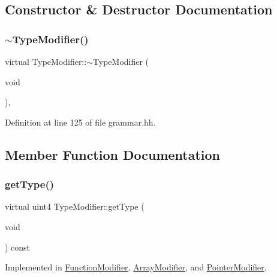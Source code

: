 \subsection{Constructor \& Destructor Documentation}
\mbox{\label{class_type_modifier_abf04bdcbbffd7d344fcd2ea3fb2e43a0}} 
\subsubsection{\texorpdfstring{$\sim$TypeModifier()}{~TypeModifier()}}
{\footnotesize\ttfamily virtual Type\+Modifier\+::$\sim$\+Type\+Modifier (\begin{DoxyParamCaption}\item[{void}]{ }\end{DoxyParamCaption})\hspace{0.3cm}{\ttfamily [inline]}, {\ttfamily [virtual]}}



Definition at line 125 of file grammar.\+hh.



\subsection{Member Function Documentation}
\mbox{\label{class_type_modifier_aac3cedefacdceace7669f57b9bd42df6}} 
\subsubsection{\texorpdfstring{getType()}{getType()}}
{\footnotesize\ttfamily virtual uint4 Type\+Modifier\+::get\+Type (\begin{DoxyParamCaption}\item[{void}]{ }\end{DoxyParamCaption}) const\hspace{0.3cm}{\ttfamily [pure virtual]}}



Implemented in \mbox{\hyperlink{class_function_modifier_a3d9dd30cfeee023391479e84b57e0c91}{Function\+Modifier}}, \mbox{\hyperlink{class_array_modifier_afdececd05d0f382f08e4c5502d8ba17c}{Array\+Modifier}}, and \mbox{\hyperlink{class_pointer_modifier_a5d4393bc7783b11b1c4d8f3c95aa3000}{Pointer\+Modifier}}.

